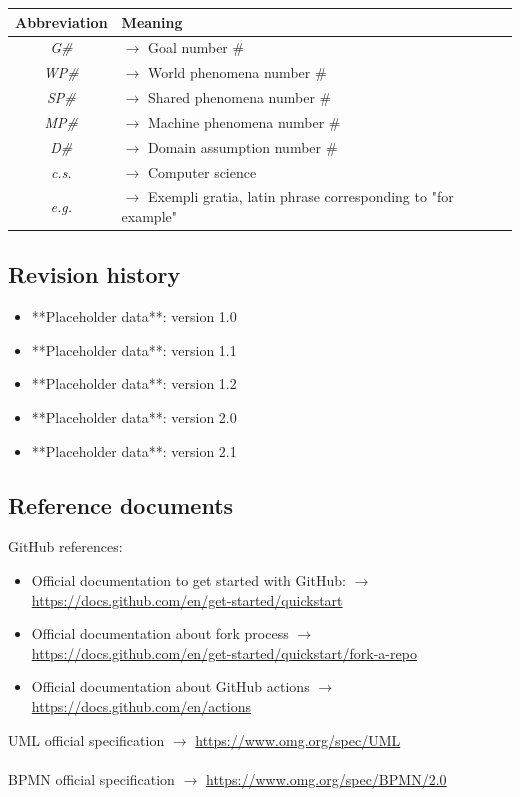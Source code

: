 \documentclass{article}
\begin{document}
{\begin{xltabular}{\textwidth}{ >{\raggedright\arraybackslash}c >{\raggedright\arraybackslash}X }
            \endfirsthead

            \hline 
            \textbf{Abbreviation} & \textbf{Meaning} \\
            \hline 

            \endhead
            \endfoot
            \endlastfoot

            \textit{G\#} & $\rightarrow$ Goal number \#
            \\
            \textit{WP\#} & $\rightarrow$ World phenomena number \#
            \\
            \textit{SP\#} & $\rightarrow$ Shared phenomena number \#
            \\
            \textit{MP\#} & $\rightarrow$ Machine phenomena number \#
            \\
            \textit{D\#} & $\rightarrow$ Domain assumption number \#
            \\
            \textit{c.s.} & $\rightarrow$ Computer science
            \\
            \textit{e.g.} & $\rightarrow$ Exempli gratia, latin phrase corresponding to "for example"
        \end{xltabular}     

\subsection{Revision history}
    \begin{itemize}
        \item **Placeholder data**: version 1.0
        \item **Placeholder data**: version 1.1
        \item **Placeholder data**: version 1.2
        \item **Placeholder data**: version 2.0
        \item **Placeholder data**: version 2.1
    \end{itemize}    
\subsection{Reference documents}
    GitHub references:
    \begin{itemize}
        \item Official documentation to get started with GitHub: $\rightarrow$ \url{https://docs.github.com/en/get-started/quickstart}
        \item Official documentation about fork process $\rightarrow$ \url{https://docs.github.com/en/get-started/quickstart/fork-a-repo}
        \item Official documentation about GitHub actions $\rightarrow$ \url{https://docs.github.com/en/actions}
    \end{itemize}
    UML official specification $\rightarrow$ \url{https://www.omg.org/spec/UML}
    \\ \\
    BPMN official specification $\rightarrow$ \url{https://www.omg.org/spec/BPMN/2.0}
}
\end{document}
